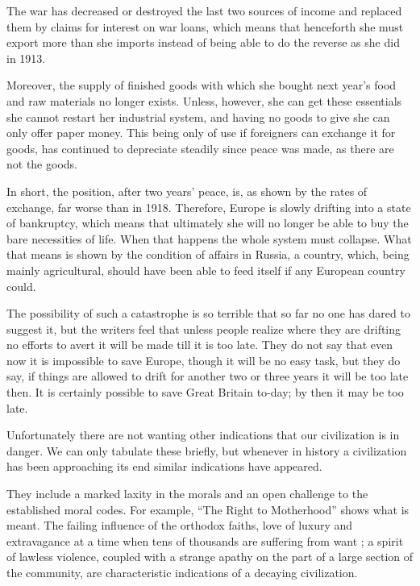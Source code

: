 \documentclass{book}
\begin{document}
The war has decreased or destroyed the last two sources of income and replaced them by claims for interest on war loans, which means that henceforth she must export more than she imports instead of being able to do the reverse as she did in 1913.

Moreover, the supply of finished goods with which she bought next year’s food and raw materials no longer exists. Unless, however, she can get these essentials she cannot restart her industrial system, and having no goods to give she can only offer paper money. This being only of use if foreigners can exchange it for goods, has continued to depreciate steadily since peace was made, as there are not the goods.

In short, the position, after two years’ peace, is, as shown by the rates of exchange, far worse than in 1918. Therefore, Europe is slowly drifting into a state of bankruptcy, which means that ultimately she will no longer be able to buy the bare necessities of life. When that happens the whole system must collapse. What that means is shown by the condition of affairs in Russia, a country, which, being mainly agricultural, should have been able to feed itself if any European country could.

The possibility of such a catastrophe is so terrible that so far no one has dared to suggest it, but the writers feel that unless people realize where they are drifting no efforts to avert it will be made till it is too late. They do not say that even now it is impossible to save Europe, though it will be no easy task, but they do say, if things are allowed to drift for another two or three years it will be too late then. It is certainly possible to save Great Britain to-day; by then it may be too late.

Unfortunately there are not wanting other indications that our civilization is in danger. We can only tabulate these briefly, but whenever in history a civilization has been approaching its end similar indications have appeared.

They include a marked laxity in the morals and an open challenge to the established moral codes. For example, “The Right to Motherhood” shows what is meant. The failing influence of the orthodox faiths, love of luxury and extravagance at a time when tens of thousands are suffering from want ; a spirit of lawless violence, coupled with a strange apathy on the part of a large section of the community, are characteristic indications of a decaying civilization.
\end{document}
